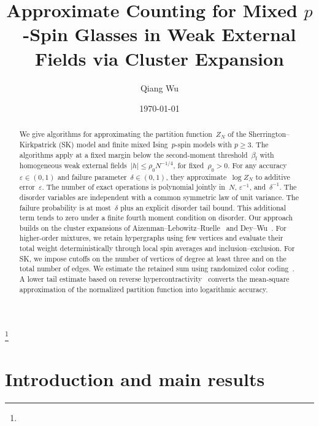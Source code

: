 \documentclass[letterpaper,11pt,reqno]{amsart}
\renewcommand{\ge}{\geqslant}
\renewcommand{\leq}{\leqslant}
\begin{document}
\title[Approximate counting for mixed $p$-spin glasses]{Approximate Counting for Mixed $p$-Spin Glasses in Weak External Fields via Cluster Expansion}
\author[Wu]{Qiang Wu}
\address{Department of Mathematics, 1291 University of Oregon, 175 Prince Lucien Campbell Hall, Eugene, OR 97403-1205, USA}
\date{\today}
\thanks{}
\begin{abstract}
We give algorithms for approximating the partition function~$Z_N$ of the Sherrington--Kirkpatrick (SK) model and finite mixed Ising~$p$-spin models with $p\ge 3$. The algorithms apply at a fixed margin below the second-moment threshold~$\beta_{\mathrm f}$ with homogeneous weak external fields~$|h|\leq\rho_0N^{-1/4}$, for fixed~$\rho_0>0$. For any accuracy~$\varepsilon\in(0,1)$ and failure parameter~$\delta\in(0,1)$, they approximate~$\log Z_N$ to additive error~$\varepsilon$. The number of exact operations is polynomial jointly in~$N$, $\varepsilon^{-1}$, and~$\delta^{-1}$. The disorder variables are independent with a common symmetric law of unit variance. The failure probability is at most~$\delta$ plus an explicit disorder tail bound. This additional term tends to zero under a finite fourth moment condition on disorder. Our approach builds on the cluster expansions of Aizenman--Lebowitz--Ruelle~\cite{ALR87} and Dey--Wu~\cites{DW23,DW26}. For higher-order mixtures, we retain hypergraphs using few vertices and evaluate their total weight deterministically through local spin averages and inclusion--exclusion. For SK, we impose cutoffs on the number of vertices of degree at least three and on the total number of edges. We estimate the retained sum using randomized color coding~\cite{AYZ95}. A lower tail estimate based on reverse hypercontractivity~\cite{MOS13} converts the mean-square approximation of the normalized partition function into logarithmic accuracy.
\end{abstract}


\maketitle
\setcounter{tocdepth}{1}\tableofcontents


\section{Introduction and main results}\label{sec:introduction}
\end{document}
